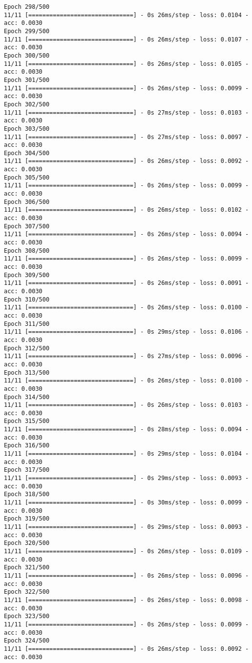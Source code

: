 \documentclass[11pt]{article}
\begin{document}
\begin{Verbatim}[commandchars=\\\{\}]
Epoch 298/500
11/11 [==============================] - 0s 26ms/step - loss: 0.0104 - acc: 0.0030
Epoch 299/500
11/11 [==============================] - 0s 26ms/step - loss: 0.0107 - acc: 0.0030
Epoch 300/500
11/11 [==============================] - 0s 26ms/step - loss: 0.0105 - acc: 0.0030
Epoch 301/500
11/11 [==============================] - 0s 26ms/step - loss: 0.0099 - acc: 0.0030
Epoch 302/500
11/11 [==============================] - 0s 27ms/step - loss: 0.0103 - acc: 0.0030
Epoch 303/500
11/11 [==============================] - 0s 27ms/step - loss: 0.0097 - acc: 0.0030
Epoch 304/500
11/11 [==============================] - 0s 26ms/step - loss: 0.0092 - acc: 0.0030
Epoch 305/500
11/11 [==============================] - 0s 26ms/step - loss: 0.0099 - acc: 0.0030
Epoch 306/500
11/11 [==============================] - 0s 26ms/step - loss: 0.0102 - acc: 0.0030
Epoch 307/500
11/11 [==============================] - 0s 26ms/step - loss: 0.0094 - acc: 0.0030
Epoch 308/500
11/11 [==============================] - 0s 26ms/step - loss: 0.0099 - acc: 0.0030
Epoch 309/500
11/11 [==============================] - 0s 26ms/step - loss: 0.0091 - acc: 0.0030
Epoch 310/500
11/11 [==============================] - 0s 26ms/step - loss: 0.0100 - acc: 0.0030
Epoch 311/500
11/11 [==============================] - 0s 29ms/step - loss: 0.0106 - acc: 0.0030
Epoch 312/500
11/11 [==============================] - 0s 27ms/step - loss: 0.0096 - acc: 0.0030
Epoch 313/500
11/11 [==============================] - 0s 26ms/step - loss: 0.0100 - acc: 0.0030
Epoch 314/500
11/11 [==============================] - 0s 26ms/step - loss: 0.0103 - acc: 0.0030
Epoch 315/500
11/11 [==============================] - 0s 28ms/step - loss: 0.0094 - acc: 0.0030
Epoch 316/500
11/11 [==============================] - 0s 29ms/step - loss: 0.0104 - acc: 0.0030
Epoch 317/500
11/11 [==============================] - 0s 29ms/step - loss: 0.0093 - acc: 0.0030
Epoch 318/500
11/11 [==============================] - 0s 30ms/step - loss: 0.0099 - acc: 0.0030
Epoch 319/500
11/11 [==============================] - 0s 29ms/step - loss: 0.0093 - acc: 0.0030
Epoch 320/500
11/11 [==============================] - 0s 26ms/step - loss: 0.0109 - acc: 0.0030
Epoch 321/500
11/11 [==============================] - 0s 26ms/step - loss: 0.0096 - acc: 0.0030
Epoch 322/500
11/11 [==============================] - 0s 26ms/step - loss: 0.0098 - acc: 0.0030
Epoch 323/500
11/11 [==============================] - 0s 26ms/step - loss: 0.0099 - acc: 0.0030
Epoch 324/500
11/11 [==============================] - 0s 26ms/step - loss: 0.0092 - acc: 0.0030

\end{Verbatim}
\end{document}
